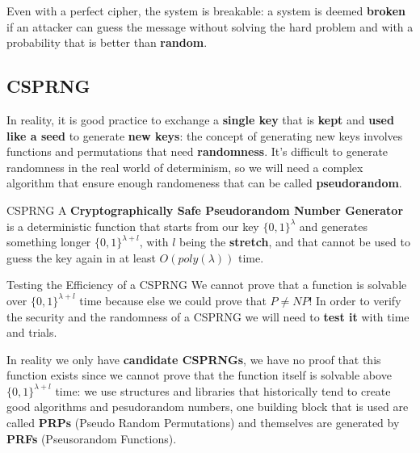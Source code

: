 Even with a perfect cipher, the system is breakable:
a system is deemed \textbf{broken} if an attacker can guess the message without
solving the hard problem and with a probability that is better than 
\textbf{random}. 

\subsection{CSPRNG}
In reality, it is good practice to exchange a \textbf{single key} that 
is \textbf{kept} and \textbf{used like  a seed} to generate \textbf{new keys}:
the concept of generating new keys involves functions and permutations that
need \textbf{randomness}. It's difficult to generate randomness in the real 
world of determinism, so we will need a complex algorithm that ensure enough
randomeness that can be called \textbf{pseudorandom}.
\begin{key}{CSPRNG}
    A \textbf{Cryptographically Safe Pseudorandom Number Generator} is a 
    deterministic function that starts from our key $\{0,1\}^\lambda$ and 
    generates something longer $\{0,1\}^{\lambda + l}$, with $l$ being the
    \textbf{stretch}, and that cannot be used to guess the key again in at 
    least $O(poly(\lambda))$ time.
\end{key}
\begin{warning}{Testing the Efficiency of a CSPRNG}
    We cannot prove that a function is solvable over $\{0,1\}^{\lambda + l}$ time
    because else we could prove that $P \ne NP$! In order to verify the 
    security and the randomness of a CSPRNG we will need to \textbf{test it}
    with time and trials.
\end{warning}
In reality we only have \textbf{candidate CSPRNGs}, we have no proof that this
function exists since we cannot prove that the function itself is solvable 
above $\{0,1\}^{\lambda + l}$ time: we use structures and libraries that 
historically tend to create good algorithms and pesudorandom numbers, one
building block that is used are called \textbf{PRPs} 
(Pseudo Random Permutations) and themselves are generated by \textbf{PRFs}
(Pseusorandom Functions).

